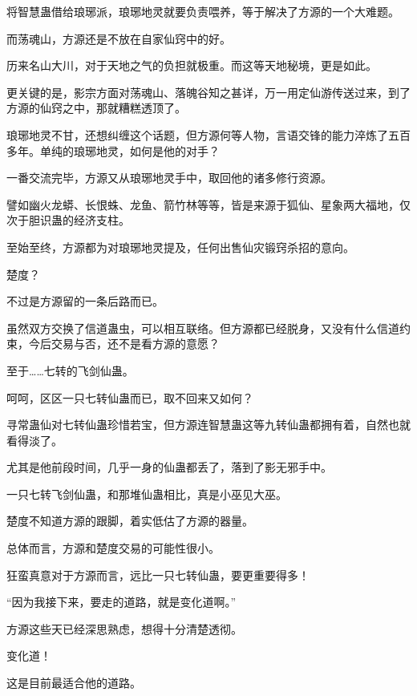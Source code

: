 \begin{this_body}
将智慧蛊借给琅琊派，琅琊地灵就要负责喂养，等于解决了方源的一个大难题。

而荡魂山，方源还是不放在自家仙窍中的好。

历来名山大川，对于天地之气的负担就极重。而这等天地秘境，更是如此。

更关键的是，影宗方面对荡魂山、落魄谷知之甚详，万一用定仙游传送过来，到了方源的仙窍之中，那就糟糕透顶了。

琅琊地灵不甘，还想纠缠这个话题，但方源何等人物，言语交锋的能力淬炼了五百多年。单纯的琅琊地灵，如何是他的对手？

一番交流完毕，方源又从琅琊地灵手中，取回他的诸多修行资源。

譬如幽火龙蟒、长恨蛛、龙鱼、箭竹林等等，皆是来源于狐仙、星象两大福地，仅次于胆识蛊的经济支柱。

至始至终，方源都为对琅琊地灵提及，任何出售仙灾锻窍杀招的意向。

楚度？

不过是方源留的一条后路而已。

虽然双方交换了信道蛊虫，可以相互联络。但方源都已经脱身，又没有什么信道约束，今后交易与否，还不是看方源的意愿？

至于……七转的飞剑仙蛊。

呵呵，区区一只七转仙蛊而已，取不回来又如何？

寻常蛊仙对七转仙蛊珍惜若宝，但方源连智慧蛊这等九转仙蛊都拥有着，自然也就看得淡了。

尤其是他前段时间，几乎一身的仙蛊都丢了，落到了影无邪手中。

一只七转飞剑仙蛊，和那堆仙蛊相比，真是小巫见大巫。

楚度不知道方源的跟脚，着实低估了方源的器量。

总体而言，方源和楚度交易的可能性很小。

狂蛮真意对于方源而言，远比一只七转仙蛊，要更重要得多！

“因为我接下来，要走的道路，就是变化道啊。”

方源这些天已经深思熟虑，想得十分清楚透彻。

变化道！

这是目前最适合他的道路。

\end{this_body}

